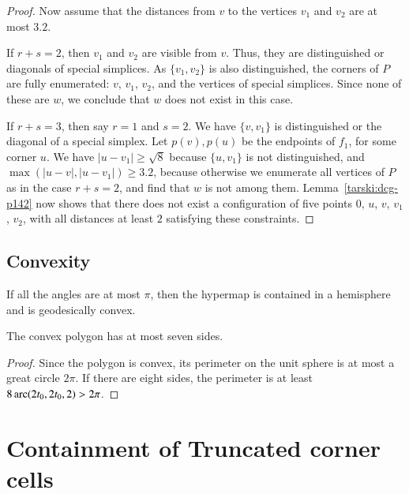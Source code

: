 \begin{proof}
Now assume that the distances from $v$ to the vertices $v_1$ and
$v_2$ are at most $3.2$.

If $r+s=2$, then $v_1$ and $v_2$ are visible from $v$. Thus, they
are distinguished or diagonals of special simplices. As
$\{v_1,v_2\}$ is also distinguished, the corners of $P$ are fully
enumerated: $v$, $v_1$, $v_2$, and the vertices of special
simplices.  Since none of these are $w$, we conclude that $w$ does
not exist in this case.

If $r+s=3$, then say $r=1$ and $s=2$. We have $\{v,v_1\}$ is
distinguished or the diagonal of a special simplex. Let
$p(v),p(u)$ be the endpoints of $f_1$, for some corner $u$. We
have $|u-v_1|\ge\sqrt8$ because $\{u,v_1\}$ is not distinguished,
and $\max(|u-v|,|u-v_1|)\ge3.2$, because otherwise we enumerate
all vertices of $P$ as in the case $r+s=2$, and find that $w$ is
not among them. Lemma~\ref{tarski:dcg-p142} now shows that
there does not exist a configuration of five points
$0$, $u$, $v$, $v_1$, $v_2$, with all distances at least $2$
satisfying these constraints.
\end{proof}










\subsection{Convexity}

If all the angles are at most $\pi$,
then the hypermap is contained in a hemisphere and
is geodesically convex.



\begin{lemma}
    \label{lemma:7-sides}
The convex polygon has at most seven sides.
\end{lemma}

\begin{proof}
Since the polygon is convex, its perimeter on the unit sphere is at
most a great circle $2\pi$.  If there are eight sides, the perimeter
is at least $8\operatorname{arc}(2t_0,2t_0,2)>2\pi$.
\end{proof}




\section{Containment of Truncated corner cells} %


